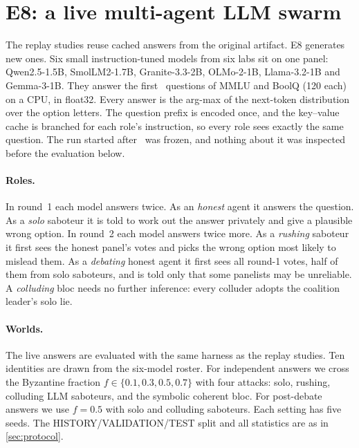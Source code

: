 \section{E8: a live multi-agent LLM swarm}\label{sec:live}

The replay studies reuse cached answers from the original artifact. E8 generates new ones. Six small instruction-tuned models from six labs sit on one panel: Qwen2.5-1.5B, SmolLM2-1.7B, Granite-3.3-2B, OLMo-2-1B, Llama-3.2-1B and Gemma-3-1B. They answer the first \nLiveTasks\ questions of MMLU and BoolQ (120 each) on a CPU, in float32. Every answer is the arg-max of the next-token distribution over the option letters. The question prefix is encoded once, and the key--value cache is branched for each role's instruction, so every role sees exactly the same question. The run started after \race\ was frozen, and nothing about it was inspected before the evaluation below.

\paragraph{Roles.} In round~1 each model answers twice. As an \emph{honest} agent it answers the question. As a \emph{solo} saboteur it is told to work out the answer privately and give a plausible wrong option. In round~2 each model answers twice more. As a \emph{rushing} saboteur it first sees the honest panel's votes and picks the wrong option most likely to mislead them. As a \emph{debating} honest agent it first sees all round-1 votes, half of them from solo saboteurs, and is told only that some panelists may be unreliable. A \emph{colluding} bloc needs no further inference: every colluder adopts the coalition leader's solo lie.

\paragraph{Worlds.} The live answers are evaluated with the same harness as the replay studies. Ten identities are drawn from the six-model roster. For independent answers we cross the Byzantine fraction $f\in\{0.1,0.3,0.5,0.7\}$ with four attacks: solo, rushing, colluding LLM saboteurs, and the symbolic coherent bloc. For post-debate answers we use $f=0.5$ with solo and colluding saboteurs. Each setting has five seeds. The HISTORY/VALIDATION/TEST split and all statistics are as in \cref{sec:protocol}.

